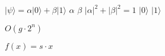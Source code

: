 $|\psi\rangle = \alpha|0\rangle + \beta|1\rangle$
$\alpha$
$\beta$
$|\alpha|^2 + |\beta|^2 = 1$
$|0\rangle$
$|1\rangle$

$O(g \cdot 2^n)$

\(f(x) = s \cdot x\)
